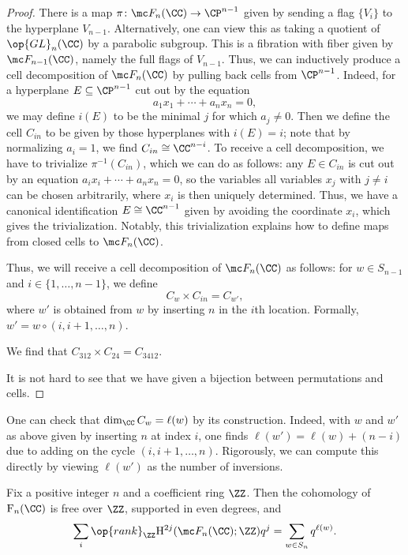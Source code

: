 \documentclass[../notes.tex]{subfiles}
\begin{document}
\begin{proof}
	There is a map $\pi\colon\mc F_n(\CC)\to\CP^{n-1}$ given by sending a flag $\{V_i\}$ to the hyperplane $V_{n-1}$. Alternatively, one can view this as taking a quotient of $\op{GL}_n(\CC)$ by a parabolic subgroup. This is a fibration with fiber given by $\mc F_{n-1}(\CC)$, namely the full flags of $V_{n-1}$. Thus, we can inductively produce a cell decomposition of $\mc F_n(\CC)$ by pulling back cells from $\CP^{n-1}$. Indeed, for a hyperplane $E\subseteq\CP^{n-1}$ cut out by the equation
	\[a_1x_1+\cdots+a_nx_n=0,\]
	we may define $i(E)$ to be the minimal $j$ for which $a_j\ne0$. Then we define the cell $C_{in}$ to be given by those hyperplanes with $i(E)=i$; note that by normalizing $a_i=1$, we find $C_{in}\cong\CC^{n-i}$. To receive a cell decomposition, we have to trivialize $\pi^{-1}(C_{in})$, which we can do as follows: any $E\in C_{in}$ is cut out by an equation $a_ix_i+\cdots+a_nx_n=0$, so the variables all variables $x_j$ with $j\ne i$ can be chosen arbitrarily, where $x_i$ is then uniquely determined. Thus, we have a canonical identification $E\cong\CC^{n-1}$ given by avoiding the coordinate $x_i$, which gives the trivialization. Notably, this trivialization explains how to define maps from closed cells to $\mc F_n(\CC)$.

	Thus, we will receive a cell decomposition of $\mc F_n(\CC)$ as follows: for $w\in S_{n-1}$ and $i\in\{1,\ldots,n-1\}$, we define
	\[C_w\times C_{in}=C_{w'},\]
	where $w'$ is obtained from $w$ by inserting $n$ in the $i$th location. Formally, $w'=w\circ(i,i+1,\ldots,n)$.
	\begin{example}
		We find that $C_{312}\times C_{24}=C_{3412}$.
	\end{example}
	It is not hard to see that we have given a bijection between permutations and cells.
\end{proof}
\begin{remark} \label{rem:compute-dim-schubert}
	One can check that $\dim_\CC C_w=\ell(w)$ by its construction. Indeed, with $w$ and $w'$ as above given by inserting $n$ at index $i$, one finds $\ell(w')=\ell(w)+(n-i)$ due to adding on the cycle $(i,i+1,\ldots,n)$. Rigorously, we can compute this directly by viewing $\ell(w')$ as the number of inversions.
\end{remark}
\begin{proposition}
	Fix a positive integer $n$ and a coefficient ring $\ZZ$. Then the cohomology of $\mathrm F_n(\CC)$ is free over $\ZZ$, supported in even degrees, and
	\[\sum_i\op{rank}_\ZZ\mathrm H^{2j}(\mc F_n(\CC);\ZZ)q^j=\sum_{w\in S_n}q^{\ell(w)}.\]
\end{proposition}
\end{document}
